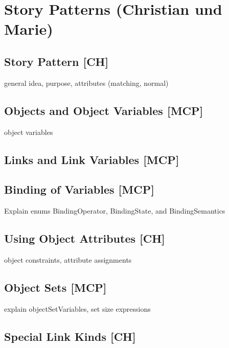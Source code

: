 \section{Story Patterns (Christian und Marie)} \label{sec:StoryPatterns}


\subsection{Story Pattern [CH]}

general idea, purpose, attributes (matching, normal)

\subsection{Objects and Object Variables [MCP]}

object variables

\subsection{Links and Link Variables [MCP]}

\subsection{Binding of Variables [MCP]}

Explain enums BindingOperator, BindingState, and BindingSemantics

\subsection{Using Object Attributes [CH]}

object constraints, attribute assignments

\subsection{Object Sets [MCP]}

explain objectSetVariables, set size expressions

\subsection{Special Link Kinds [CH]}


